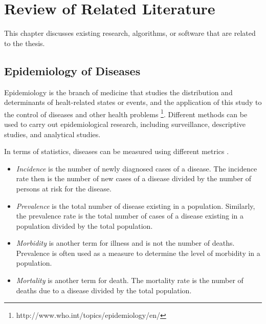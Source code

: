 %
%
%                 

\chapter{Review of Related Literature}
\label{sec:relatedlit}

This chapter discusses existing research, algorithms, or software that are related to the thesis.


\section{Epidemiology of Diseases}
Epidemiology is the branch of medicine that studies the distribution and determinants of healt-related states or events, and the application of this study to the control of diseases and other health problems \footnote{http://www.who.int/topics/epidemiology/en/}.
Different methods can be used to carry out epidemiological research, including surveillance, descriptive studies, and analytical studies.

In terms of statistics, diseases can be measured using different metrics \cite{nydoh:1999}. 
\begin{itemize}
\item \textit{Incidence} is the number of newly diagnosed cases of a disease. The incidence rate then is the number of new cases of a disease divided by the number of persons at risk for the disease.
\item \textit{Prevalence} is the total number of disease existing in a population. 
Similarly, the prevalence rate is the total number of cases of a disease existing in a population divided by the total population.
\item \textit{Morbidity} is another term for illness and is not the number of deaths. 
Prevalence is often used as a measure to determine the level of morbidity in a population.
\item \textit{Mortality} is another term for death. The mortality rate is the number of deaths due to a disease divided by the total population.
\end{itemize}


